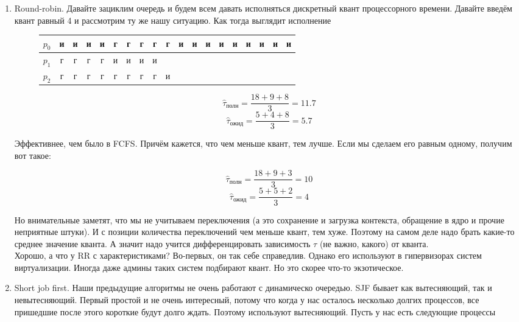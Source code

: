 \documentclass{article}
\begin{document}
\begin{enumerate}
        \item Round-robin. Давайте зациклим очередь и будем всем давать исполняться дискретный квант процессорного времени. Давайте введём квант равный 4 и рассмотрим ту же нашу ситуацию. Как тогда выглядит исполнение
        \begin{figure}[H]
            \begin{tabular}{|c|cccc|cccc|c|ccccccccc|}
                \hline
                $p_0$&и&и&и&и&г&г&г&г&г&и&и&и&и&и&и&и&и&и\\
                \hline
                $p_1$&г&г&г&г&и&и&и&и&&&&&&&&&&\\
                \hline
                $p_2$&г&г&г&г&г&г&г&г&и&&&&&&&&&\\
                \hline
            \end{tabular}
        \end{figure}
        \begin{multicols}{2}
            $$\hat\tau_{\text{полн}}=\frac{18+9+8}3=11.7$$
            \columnbreak
            $$\hat\tau_{\text{ожид}}=\frac{5+4+8}3=5.7$$
        \end{multicols}
        Эффективнее, чем было в FCFS. Причём кажется, что чем меньше квант, тем лучше. Если мы сделаем его равным одному, получим вот такое:
        \begin{multicols}{2}
            $$\hat\tau_{\text{полн}}=\frac{18+9+3}3=10$$
            \columnbreak
            $$\hat\tau_{\text{ожид}}=\frac{5+5+2}3=4$$
        \end{multicols}
        Но внимательные заметят, что мы не учитываем переключения (а это сохранение и загрузка контекста, обращение в ядро и прочие неприятные штуки). И с позиции количества переключений чем меньше квант, тем хуже. Поэтому на самом деле надо брать какие-то среднее значение кванта. А значит надо учится дифференцировать зависимость $\tau$ (не важно, какого) от кванта.\\
        Хорошо, а что у RR с характеристиками? Во-первых, он так себе справедлив. Однако его используют в гипервизорах систем виртуализации. Иногда даже админы таких систем подбирают квант. Но это скорее что-то экзотическое.
        \item Short job first. Наши предыдущие алгоритмы не очень работают с динамическо очередью. SJF бывает как вытесняющий, так и невытесняющий. Первый простой и не очень интересный, потому что когда у нас осталось несколько долгих процессов, все пришедшие после этого короткие будут долго ждать. Поэтому используют вытесняющий. Пусть у нас есть следующие процессы

\end{enumerate}
\end{document}
